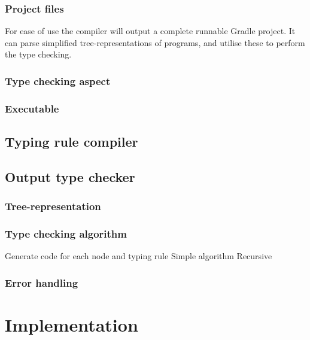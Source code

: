 \documentclass[nofilelist]{cslthse-msc}
\begin{document}
\subsubsection{Project files}\label{projectfiles}
For ease of use the compiler will output a complete runnable Gradle project.
It can parse simplified tree-representations of programs, and utilise these to perform the type checking.

\subsubsection{Type checking aspect}\label{typecheckingaspect}

\subsubsection{Executable}

\subsection{Typing rule compiler}\label{typingrulecompiler}

\subsection{Output type checker}
\subsubsection{Tree-representation}
\subsubsection{Type checking algorithm}\label{typecheckingalgorithm}
Generate code for each node and typing rule
Simple algorithm
Recursive
\subsubsection{Error handling}





\cite{Hedin2011}
\section{Implementation} %
\end{document}
